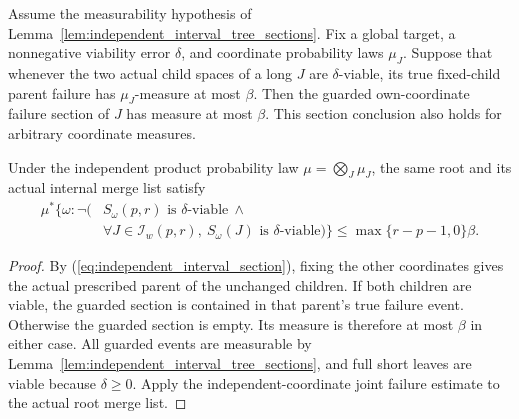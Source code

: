 \begin{lemma}
    \label{lem:independent_interval_parent_probability}
    \leanok
    Assume the measurability hypothesis of
    Lemma~\ref{lem:independent_interval_tree_sections}. Fix a global target,
    a nonnegative viability error $\delta$, and coordinate probability
    laws $\mu_J$. Suppose that whenever the two actual child spaces of a
    long $J$ are $\delta$-viable, its true fixed-child parent failure has
    $\mu_J$-measure at most $\beta$.
    Then the guarded own-coordinate failure section of $J$ has measure
    at most $\beta$. This section conclusion also holds for arbitrary
    coordinate measures.

    Under the independent product probability law $\mu=\bigotimes_J\mu_J$,
    the same root and its actual internal merge list satisfy
    \begin{align}
        \mu^*\bigl\{\omega:\neg\bigl( & S_\omega(p,r)\text{ is $\delta$-viable}\ \land\nonumber \\
                                      & \forall J\in\mathcal I_w(p,r),\ S_\omega(J)
        \text{ is $\delta$-viable}\bigr)\bigr\}
        \le\max\{r-p-1,0\}\beta.
    \end{align}
\end{lemma}
\begin{proof}\leanok
    By (\ref{eq:independent_interval_section}), fixing the other coordinates
    gives the actual prescribed parent of the unchanged children.
    If both children are viable, the guarded section is contained in
    that parent's true failure event. Otherwise the guarded section is
    empty. Its measure is therefore at most $\beta$ in either case.
    All guarded events are measurable by
    Lemma~\ref{lem:independent_interval_tree_sections}, and full short leaves
    are viable because $\delta\ge0$. Apply the independent-coordinate
    joint failure estimate to the actual root merge list.
\end{proof}




